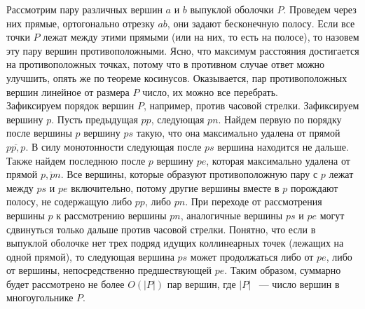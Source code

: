 Рассмотрим пару различных вершин $a$ и $b$ выпуклой оболочки $P$. Проведем
через них прямые, ортогонально отрезку $ab$, они задают бесконечную
полосу. Если все точки $P$ лежат
между этими прямыми (или на них, то есть на полосе),
то назовем эту пару вершин противоположными.
Ясно, что максимум расстояния достигается на противоположных точках,
потому что в противном случае ответ можно улучшить, опять же
по теореме косинусов.
Оказывается, пар противоположных вершин линейное от размера $P$ число,
их можно все перебрать.\\
Зафиксируем порядок вершин $P$, например, против часовой стрелки. Зафиксируем
вершину $p$. Пусть предыдущая $pp$, следующая $pn$. Найдем первую
по порядку после вершины $p$ вершину $ps$ такую, что она максимально
удалена от прямой $\overline{pp,p}$.
В силу монотонности следующая после $ps$ вершина
находится не дальше. Также найдем последнюю после $p$ вершину $pe$,
которая максимально удалена от прямой $\overline{p,pn}$.
Все вершины, которые образуют
противоположную пару с $p$ лежат между $ps$ и $pe$ включительно,
потому другие вершины вместе в $p$ порождают полосу, не содержащую
либо $pp$, либо $pn$. При переходе от рассмотрения вершины $p$ к рассмотрению
вершины $pn$, аналогичные вершины $ps$ и $pe$ могут сдвинуться
только дальше против часовой стрелки. Понятно, что если в выпуклой
оболочке нет трех подряд идущих коллинеарных точек (лежащих на одной прямой),
то следующая вершина $ps$ может продолжаться либо от $pe$, либо от вершины,
непосредственно предшествующей $pe$. Таким образом, суммарно
будет рассмотрено не более $O(|P|)$ пар вершин,
где $|P|$ ~--- число вершин в многоугольнике $P$.\\
